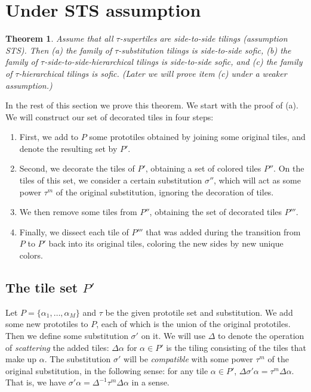 \documentclass[12pt]{article}
\newtheorem{theorem}{Theorem}
\theoremstyle{remark}
\begin{document}
\section{Under STS assumption}
\begin{theorem}\label{th22}
  Assume that all $\tau$-supertiles are side-to-side tilings (assumption STS).
  Then (a)  the family of  $\tau$-substitution tilings  is side-to-side sofic, (b)
  the family of $\tau$-side-to-side-hierarchical tilings is  side-to-side sofic,
and (c) the family of $\tau$-hierarchical tilings is  sofic.
(Later we will prove item (c) under a weaker assumption.)
\end{theorem}
In the rest of this section we prove this theorem.
We start with the proof of (a).
We will construct our set of decorated tiles in four steps:
\begin{enumerate}
\item First, we add to $P$ some prototiles obtained by joining
some original tiles, and denote the resulting set by $P'$.

\item Second, we decorate the tiles of $P'$, obtaining a set of colored tiles $P''$.
On the tiles of this set, we consider a certain substitution $\sigma''$,
which will act as some power $\tau^m$ of the original substitution,
ignoring the decoration of  tiles.

\item We then remove some tiles
from $P''$, obtaining the set of decorated tiles $P'''$.
\item Finally, we dissect each tile of $P'''$ that was added during the transition from $P$ to $P'$ back into its original tiles, coloring the new sides by new unique colors.
\end{enumerate}

\subsection{The tile set $P'$}\label{s3.1}
Let $P=\{\alpha_1,\dots,\alpha_M\}$ and $\tau$ be the given prototile set and substitution.
We add some new prototiles to $P$, each of which is the union of the original
prototiles. Then we define some substitution $\sigma'$ on it.
We will use $\Delta$ to denote the operation of \emph{scattering} the added tiles:
$\Delta \alpha$ for $\alpha\in P'$ is the tiling consisting of the tiles that make up
$\alpha$.
The substitution $\sigma'$ will be \emph{compatible} with some power
$\tau^m$ of the original substitution, in the following sense: for any tile $\alpha\in P'$,
$\Delta\sigma'\alpha=\tau^m\Delta\alpha$. That is, we have $\sigma'\alpha=\Delta^{-1}\tau^m\Delta\alpha$ in a sense.
\end{document}
